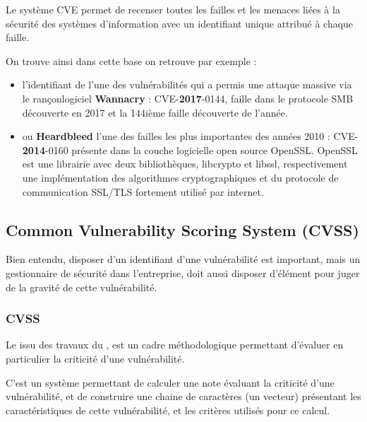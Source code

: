 Le système CVE permet de recenser toutes les failles et les menaces liées à la sécurité des systèmes d’information avec  un identifiant unique  attribué à chaque faille.

On trouve ainsi dans cette base on retrouve par exemple :

\begin{itemize}
  \item l’identifiant de l’une des  vulnérabilités qui a permis une attaque massive via le rançonlogiciel \textbf{Wannacry} : CVE-\textbf{2017}-0144,  faille dans le protocole SMB découverte en 2017 et la 144ième faille découverte de l'année.
  \item ou \textbf{Heardbleed} l’une des failles les plus importantes des années 2010 : CVE-\textbf{2014}-0160 présente dans la couche logicielle open source OpenSSL. OpenSSL est une librairie avec deux bibliothèques, libcrypto et libssl,  respectivement une implémentation des algorithmes cryptographiques et du protocole de communication SSL/TLS fortement utilisé par internet.
\end{itemize}


\subsection{Common Vulnerability Scoring System (CVSS)}

Bien entendu, disposer d'un identifiant d'une vulnérabilité est important, mais  un gestionnaire de sécurité dans l'entreprise, doit aussi disposer d'élément pour juger de la gravité de cette vulnérabilité. 


\begin{frame}
\frametitle<presentation>{CVSS}
Le   issu des travaux du  , est un cadre méthodologique permettant d'évaluer en particulier la criticité d'une vulnérabilité.
\end{frame}


C'est un système permettant de calculer une note évaluant la criticité d'une vulnérabilité, et de construire une chaine de caractères (un vecteur) présentant les caractéristiques de cette vulnérabilité, et les critères utilisés pour ce calcul.

